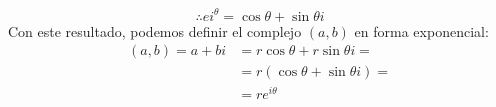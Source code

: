 \documentclass[12pt, twocolumn]{article}
\begin{document}
$$\therefore ei^{\theta}=\cos{\theta}+\sin{\theta}i$$
Con este resultado, podemos definir el complejo $(a,b)$ en forma exponencial:
\begin{equation*}
    \begin{aligned}
        (a,b)=a+bi &=r\cos{\theta}+r\sin{\theta}i=\\
                   &=r(\cos{\theta}+\sin{\theta}i)=\\
                   &=\boxed{re^{i\theta}}
    \end{aligned}
\end{equation*}
\end{document}
